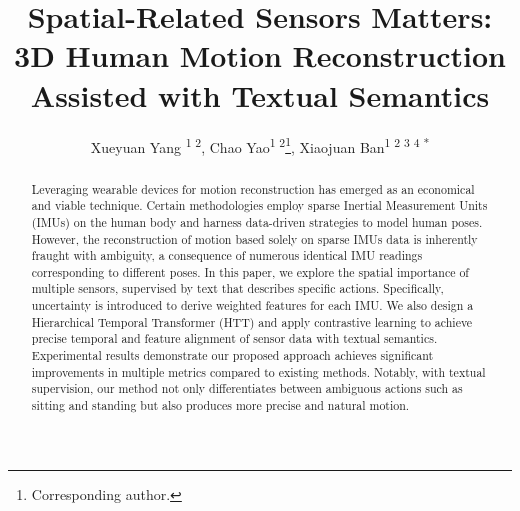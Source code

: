 \documentclass[letterpaper]{article} %
\title{Spatial-Related Sensors Matters: 3D Human Motion Reconstruction Assisted with Textual Semantics}
\author{
    Xueyuan Yang \textsuperscript{\rm 1 2},
    Chao Yao\textsuperscript{\rm 1 2}\thanks{Corresponding author.},
    Xiaojuan Ban\textsuperscript{\rm 1 2 3 4 *}
}
\begin{document}
\maketitle


\begin{abstract}
Leveraging wearable devices for motion reconstruction has emerged as an economical and viable technique. Certain methodologies employ sparse Inertial Measurement Units (IMUs) on the human body and harness data-driven strategies to model human poses.
However, the reconstruction of motion based solely on sparse IMUs data is inherently fraught with ambiguity, a consequence of numerous identical IMU readings corresponding to different poses.
In this paper, we explore the spatial importance of multiple sensors, supervised by text that describes specific actions. Specifically, uncertainty is introduced to derive weighted features for each IMU. We also design a Hierarchical Temporal Transformer (HTT) and apply contrastive learning to achieve precise temporal and feature alignment of sensor data with textual semantics.
Experimental results demonstrate our proposed approach achieves significant improvements in multiple metrics compared to existing methods. Notably, with textual supervision, our method not only differentiates between ambiguous actions such as sitting and standing but also produces more precise and natural motion.
\end{abstract}
\end{document}
